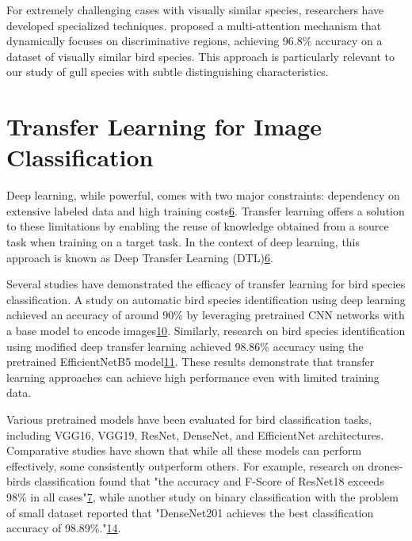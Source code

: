 \documentclass[a4paper,12pt]{report}
\begin{document}
For extremely challenging cases with visually similar species, researchers have developed specialized techniques. \citep{he2022bird} proposed a multi-attention mechanism that dynamically focuses on discriminative regions, achieving 96.8\% accuracy on a dataset of visually similar bird species. This approach is particularly relevant to our study of gull species with subtle distinguishing characteristics.


\section*{Transfer Learning for Image Classification}
Deep learning, while powerful, comes with two major constraints: dependency on extensive labeled data and high training costs\href{https://arxiv.org/abs/2201.09679}{6}. Transfer learning offers a solution to these limitations by enabling the reuse of knowledge obtained from a source task when training on a target task. In the context of deep learning, this approach is known as Deep Transfer Learning (DTL)\href{https://arxiv.org/abs/2201.09679}{6}.

Several studies have demonstrated the efficacy of transfer learning for bird species classification. A study on automatic bird species identification using deep learning achieved an accuracy of around 90\% by leveraging pretrained CNN networks with a base model to encode images\href{https://www.semanticscholar.org/paper/41b0718279f408654094557156d4eeeb0067b2c4}{10}. Similarly, research on bird species identification using modified deep transfer learning achieved 98.86\% accuracy using the pretrained EfficientNetB5 model\href{https://www.semanticscholar.org/paper/770ee68d1b136cd098a018a399d1f69af29faae0}{11}. These results demonstrate that transfer learning approaches can achieve high performance even with limited training data.

Various pretrained models have been evaluated for bird classification tasks, including VGG16, VGG19, ResNet, DenseNet, and EfficientNet architectures. Comparative studies have shown that while all these models can perform effectively, some consistently outperform others. For example, research on drones-birds classification found that "the accuracy and F-Score of ResNet18 exceeds 98\% in all cases"\href{https://www.semanticscholar.org/paper/c16f57236555aae3f600ef8f1978eff10b410233}{7}, while another study on binary classification with the problem of small dataset reported that "DenseNet201 achieves the best classification accuracy of 98.89\%."\href{https://www.semanticscholar.org/paper/6529ad5f1094a8d9b0ab38db163c7fdaad2a1d9c}{14}.
\end{document}
